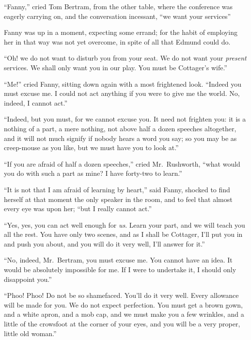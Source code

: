 ``Fanny,'' cried Tom Bertram, from the other table,
where the conference was eagerly carrying on, and the
conversation incessant, ``we want your services''

Fanny was up in a moment, expecting some errand; for the
habit of employing her in that way was not yet overcome,
in spite of all that Edmund could do.

``Oh! we do not want to disturb you from your seat.
We do not want your \emph{present} services.  We shall only want
you in our play.  You must be Cottager's wife.''

``Me!'' cried Fanny, sitting down again with a most frightened look.
``Indeed you must excuse me.  I could not act anything
if you were to give me the world.  No, indeed, I cannot act.''

``Indeed, but you must, for we cannot excuse you.
It need not frighten you:  it is a nothing of a part,
a mere nothing, not above half a dozen speeches altogether,
and it will not much signify if nobody hears a word you say;
so you may be as creep-mouse as you like, but we must have
you to look at.''

``If you are afraid of half a dozen speeches,'' cried Mr.\ Rushworth,
``what would you do with such a part as mine?  I have forty-two to
learn.''

``It is not that I am afraid of learning by heart,''
said Fanny, shocked to find herself at that moment the
only speaker in the room, and to feel that almost every
eye was upon her; ``but I really cannot act.''

``Yes, yes, you can act well enough for \emph{us}.
Learn your part, and we will teach you all the rest.
You have only two scenes, and as I shall be Cottager,
I'll put you in and push you about, and you will do it
very well, I'll answer for it.''

``No, indeed, Mr.\ Bertram, you must excuse me.  You cannot
have an idea.  It would be absolutely impossible for me.
If I were to undertake it, I should only disappoint you.''

``Phoo!  Phoo!  Do not be so shamefaced.  You'll do it
very well.  Every allowance will be made for you.
We do not expect perfection.  You must get a brown gown,
and a white apron, and a mob cap, and we must make
you a few wrinkles, and a little of the crowsfoot at
the corner of your eyes, and you will be a very proper,
little old woman.''


